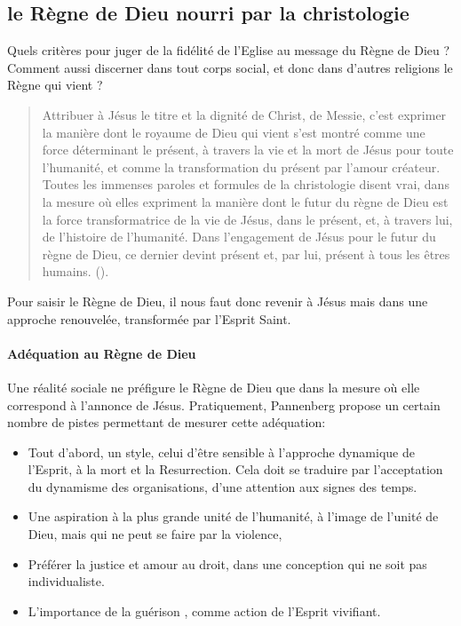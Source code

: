 \subsection{le Règne de Dieu nourri par la christologie}

Quels critères pour juger de la fidélité de l'Eglise au message du Règne de Dieu ? Comment aussi discerner dans tout corps social, et donc dans d'autres religions le Règne qui vient ? 

\begin{quote}
    Attribuer à Jésus le titre et la dignité de Christ, de Messie, c’est exprimer la manière dont le royaume de Dieu qui vient s’est montré comme une force déterminant le présent, à travers la vie et la mort de Jésus pour toute l’humanité, et comme la transformation du présent par l’amour créateur. Toutes les immenses paroles et formules de la christologie disent vrai, dans la mesure où elles expriment la manière dont le futur du règne de Dieu est la force transformatrice de la vie de Jésus, dans le présent, et, à travers lui, de l’histoire de l’humanité. Dans l’engagement de Jésus pour le futur du règne de Dieu, ce dernier devint présent et, par lui, présent à tous les êtres humains. (\cite[pp. 94-95]{Pannenberg:RoyaumeDieu}). 
\end{quote}
Pour saisir le Règne de Dieu, il nous faut donc revenir à Jésus mais dans une approche renouvelée, transformée par l'Esprit Saint. 

\paragraph{Adéquation au Règne de Dieu}
Une réalité sociale ne préfigure le Règne de Dieu que dans la mesure où elle correspond à l'annonce de Jésus. Pratiquement, Pannenberg propose un certain nombre de pistes permettant de mesurer cette adéquation: 
\begin{itemize}
    \item Tout d'abord, un style, celui d'être sensible à l'approche dynamique de l'Esprit, à la mort et la Resurrection. Cela doit se traduire par l'acceptation du dynamisme des organisations, d'une attention aux signes des temps. 
    \item Une aspiration à la plus grande unité de l'humanité, à l'image de l'unité de Dieu, mais qui ne peut se faire par la violence,
    \item Préférer la justice et amour au droit, dans une conception qui ne soit pas individualiste.
    \item L'importance de la guérison \cite[pp. 87]{Pannenberg:RoyaumeDieu}, comme action de l'Esprit vivifiant.
\end{itemize}

